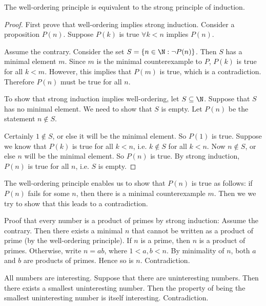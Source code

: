 \documentclass[a4paper]{article}
\begin{document}
  \begin{thm}
    The well-ordering principle is equivalent to the strong principle of induction.
  \end{thm}

  \begin{proof}
    First prove that well-ordering implies strong induction. Consider a proposition $P(n)$. Suppose $P(k)$ is true $\forall k < n$ implies $P(n)$.

    Assume the contrary. Consider the set $S = \{n\in \N : \neg P(n)\}$. Then $S$ has a minimal element $m$. Since $m$ is the minimal counterexample to $P$, $P(k)$ is true for all $k < m$. However, this implies that $P(m)$ is true, which is a contradiction. Therefore $P(n)$ must be true for all $n$.

    To show that strong induction implies well-ordering, let $S\subseteq \N$. Suppose that $S$ has no minimal element. We need to show that $S$ is empty. Let $P(n)$ be the statement $n\not\in S$. 

    Certainly $1\not\in S$, or else it will be the minimal element. So $P(1)$ is true. Suppose we know that $P(k)$ is true for all $k < n$, i.e. $k\not\in S$ for all $k < n$. Now $n\not\in S$, or else $n$ will be the minimal element. So $P(n)$ is true. By strong induction, $P(n)$ is true for all $n$, i.e. $S$ is empty.
  \end{proof}
  \note The well-ordering principle enables us to show that $P(n)$ is true as follows: if $P(n)$ fails for some $n$, then there is a minimal counterexample $m$. Then we we try to show that this leads to a contradiction.

  \begin{eg}
    Proof that every number is a product of primes by strong induction: Assume the contrary. Then there exists a minimal $n$ that cannot be written as a product of prime (by the well-ordering principle). If $n$ is a prime, then $n$ is a product of primes. Otherwise, write $n = ab$, where $1 < a, b < n$. By minimality of $n$, both $a$ and $b$ are products of primes. Hence so is $n$. Contradiction.
  \end{eg}

  \begin{eg}
    All numbers are interesting. Suppose that there are uninteresting numbers. Then there exists a smallest uninteresting number. Then the property of being the smallest uninteresting number is itself interesting. Contradiction.
  \end{eg}
\end{document}
